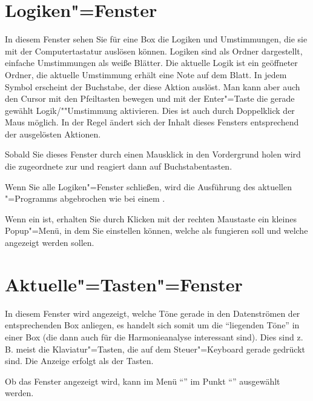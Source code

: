 {
\section{Logiken"=Fenster}\label{sec:DE_LOGIC}
In diesem Fenster sehen Sie für eine Box die Logiken und Umstimmungen,
die sie mit der Computertastatur auslösen können. Logiken sind als
Ordner dargestellt, einfache Umstimmungen als weiße Blätter. Die
aktuelle Logik ist ein geöffneter Ordner, die aktuelle Umstimmung
erhält eine Note auf dem Blatt. In jedem Symbol erscheint der
Buchstabe, der diese Aktion auslöst. Man kann aber auch den Cursor mit
den Pfeiltasten bewegen und mit der Enter"=Taste die gerade gewählt
Logik/""Umstimmung aktivieren.  Dies ist auch durch Doppelklick der Maus
möglich. In der Regel ändert sich der Inhalt dieses Fensters
entsprechend der ausgelösten Aktionen.


Sobald Sie dieses Fenster durch einen Mausklick in den Vordergrund
holen wird die zugeordnete  zur
 und reagiert dann auf
Buchstabentasten.


Wenn Sie alle Logiken"=Fenster schließen, wird die Ausführung des
aktuellen \mutabor{}"=Programms abgebrochen wie bei einem
.


Wenn ein 
 ist, erhalten Sie durch Klicken
mit der rechten Maustaste ein kleines Popup"=Menü, in dem Sie
einstellen können, welche  als
 fungieren soll und welche
 angezeigt werden sollen.

\section{Aktuelle"=Tasten"=Fenster}\label{sec:DE_KEY}
In diesem Fenster wird angezeigt, welche Töne gerade in den
Datenströmen der entsprechenden Box anliegen, es handelt sich somit um
die "`liegenden Töne"' in einer Box (die dann auch für die
Harmonieanalyse interessant sind). Dies sind z.\,B. meist die
Klaviatur"=Tasten, die auf dem Steuer"=Keyboard gerade gedrückt sind.
Die Anzeige erfolgt als  der
Tasten.


Ob das Fenster angezeigt wird, kann im Menü
"`"' im Punkt
"`"' ausgewählt werden.

}
